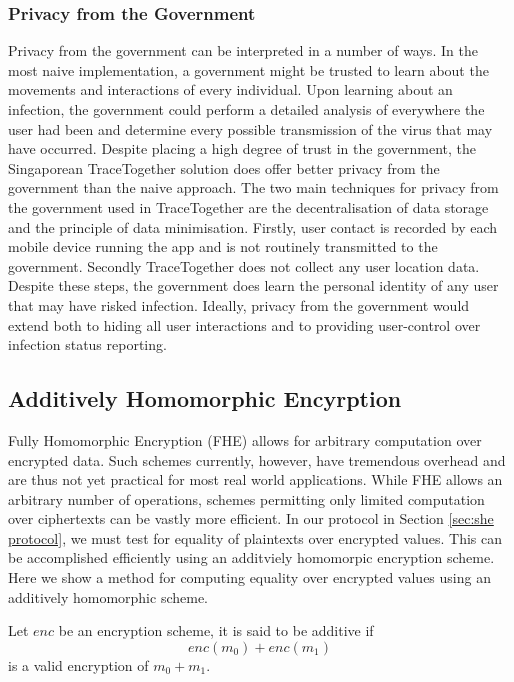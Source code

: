 \documentclass{article}
\begin{document}
\subsubsection*{Privacy from the Government}
Privacy from the government can be interpreted in a number of ways. In the most naive implementation, a government might be trusted to learn about the movements and interactions of every individual. Upon learning about an infection, the government could perform a detailed analysis of everywhere the user had been and determine every possible transmission of the virus that may have occurred. Despite placing a high degree of trust in the government, the Singaporean TraceTogether solution does offer better privacy from the government than the naive approach. The two main techniques for privacy from the government used in TraceTogether are the decentralisation of data storage and the principle of data minimisation. Firstly, user contact is recorded by each mobile device running the app and is not routinely transmitted to the government. Secondly TraceTogether does not collect any user location data. Despite these steps, the government does learn the personal identity of any user that may have risked infection. Ideally, privacy from the government would extend both to hiding all user interactions and to providing user-control over infection status reporting. 


\subsection{Additively Homomorphic Encyrption} \label{sec:additive encryption}

Fully Homomorphic Encryption (FHE) allows for arbitrary computation over encrypted data. Such schemes currently, however, have tremendous overhead and are thus not yet practical for most real world applications. While FHE allows an arbitrary number of operations, schemes permitting only limited computation over ciphertexts can be vastly more efficient. In our protocol in Section \ref{sec:she protocol}, we must test for equality of plaintexts over encrypted values. This can be accomplished efficiently using an additviely homomorpic encryption scheme. Here we show a method for computing equality over encrypted values using an additively homomorphic scheme.

Let $\mathit{enc}$ be an encryption scheme, it is said to be additive if $$\mathit{enc}(m_0) + \mathit{enc}(m_1)$$ is a valid encryption of $m_0+m_1$.
\end{document}
